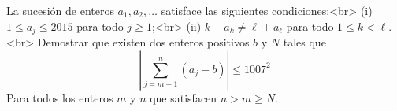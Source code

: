 La sucesión de enteros $a_1,a_2,\dots$ satisface las siguientes condiciones:<br>
(i) $1\leq a_j \leq 2015$ para todo $j\geq 1$;<br>
(ii) $k+a_k\neq\ell+a_{\ell}$ para todo $1\leq k \lt \ell$.<br>
Demostrar que existen dos enteros positivos $b$ y $N$ tales que 
\[\left\vert\sum_{j=m+1}^n(a_j-b)\right\vert\le1007^2\]
Para todos los enteros $m$ y $n$ que satisfacen $n\gt m\geq N$.